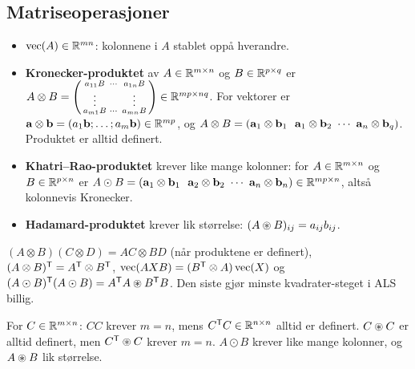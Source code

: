 \subsection{Matriseoperasjoner}
\begin{defn}
\begin{itemize}
  \item $\operatorname{vec}(A)\in\mathbb{R}^{mn}$: kolonnene i $A$ stablet oppå hverandre.
  \item \textbf{Kronecker-produktet} av $A\in\mathbb{R}^{m\times n}$ og $B\in\mathbb{R}^{p\times q}$ er
  $A\otimes B=\begin{psmallmatrix}a_{11}B&\cdots&a_{1n}B\\ \vdots&&\vdots\\ a_{m1}B&\cdots&a_{mn}B\end{psmallmatrix}\in\mathbb{R}^{mp\times nq}$.
  For vektorer er $\mathbf{a}\otimes\mathbf{b}=(a_1\mathbf{b};\dots;a_m\mathbf{b})\in\mathbb{R}^{mp}$, og $A\otimes B=(\mathbf{a}_1\otimes\mathbf{b}_1\ \ \mathbf{a}_1\otimes\mathbf{b}_2\ \cdots\ \mathbf{a}_n\otimes\mathbf{b}_q)$. Produktet er alltid definert.
  \item \textbf{Khatri--Rao-produktet} krever like mange kolonner: for $A\in\mathbb{R}^{m\times n}$ og $B\in\mathbb{R}^{p\times n}$ er
  $A\odot B=(\mathbf{a}_1\otimes\mathbf{b}_1\ \ \mathbf{a}_2\otimes\mathbf{b}_2\ \cdots\ \mathbf{a}_n\otimes\mathbf{b}_n)\in\mathbb{R}^{mp\times n}$, altså kolonnevis Kronecker.
  \item \textbf{Hadamard-produktet} krever lik størrelse: $(A\circledast B)_{ij}=a_{ij}b_{ij}$.
\end{itemize}
\end{defn}
\begin{teorem}
$(A\otimes B)(C\otimes D)=AC\otimes BD$ (når produktene er definert), $(A\otimes B)^{\mathsf{T}}=A^{\mathsf{T}}\otimes B^{\mathsf{T}}$, $\operatorname{vec}(AXB)=(B^{\mathsf{T}}\otimes A)\operatorname{vec}(X)$ og $(A\odot B)^{\mathsf{T}}(A\odot B)=A^{\mathsf{T}} A\circledast B^{\mathsf{T}} B$. Den siste gjør minste kvadrater-steget i ALS billig.
\end{teorem}
\begin{fallgruve}
For $C\in\mathbb{R}^{m\times n}$: $CC$ krever $m=n$, mens $C^{\mathsf{T}} C\in\mathbb{R}^{n\times n}$ alltid er definert. $C\circledast C$ er alltid definert, men $C^{\mathsf{T}}\circledast C$ krever $m=n$. $A\odot B$ krever like mange kolonner, og $A\circledast B$ lik størrelse.
\end{fallgruve}

